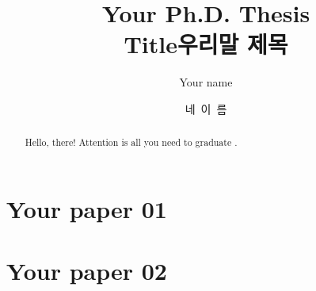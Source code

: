 \documentclass[oneside,phd]{snuthesis}
\title{Your Ph.D. Thesis \\ Title}
\title*{우리말 제목}
\author{Your name}
\author*{네~이~름} %
\begin{document}
\makefrontcover
\makeapproval
\makeapprovalkr

\iffalse

\thispagestyle{empty}
\newpage
\mbox{}
\newpage

\makefrontcover
\makeapproval

\fi

\cleardoublepage
{}

\begin{abstract}
    Hello, there! Attention is all you need to graduate \cite{Vaswani:2017:NeurIPS}.
\end{abstract}

\tableofcontents
\listoffigures
\listoftables

\cleardoublepage
{}






\chapter{Your paper 01}
\label{chp:paper01}




\chapter{Your paper 02}
\label{chp:paper02}














\end{document}
